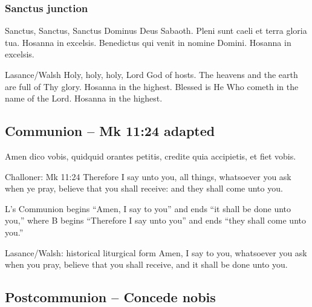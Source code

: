 \subsubsection{Sanctus junction}
\begin{latinproper}
Sanctus, Sanctus, Sanctus Dominus Deus Sabaoth. Pleni sunt caeli et terra
gloria tua. Hosanna in excelsis. Benedictus qui venit in nomine Domini.
Hosanna in excelsis.
\end{latinproper}

\begin{englishwitness}{Lasance/Walsh}
Holy, holy, holy, Lord God of hosts. The heavens and the earth are full
of Thy glory. Hosanna in the highest. Blessed is He Who cometh in the
name of the Lord. Hosanna in the highest.
\end{englishwitness}

\subsection{Communion -- Mk 11:24 adapted}
\label{proper-communion}

\begin{latinproper}
Amen dico vobis, quidquid orantes petitis, credite quia accipietis,
et fiet vobis.
\end{latinproper}

\begin{englishwitness}{Challoner: Mk 11:24}
Therefore I say unto you, all things, whatsoever you ask when ye pray,
believe that you shall receive: and they shall come unto you.
\end{englishwitness}

L's Communion begins ``Amen, I say to you'' and ends ``it shall be done
unto you,'' where B begins ``Therefore I say unto you'' and ends
``they shall come unto you.''

\begin{englishwitness}{Lasance/Walsh: historical liturgical form}
Amen, I say to you, whatsoever you ask when you pray, believe that you
shall receive, and it shall be done unto you.
\end{englishwitness}

\subsection{Postcommunion -- Concede nobis}
\label{proper-postcommunion}

